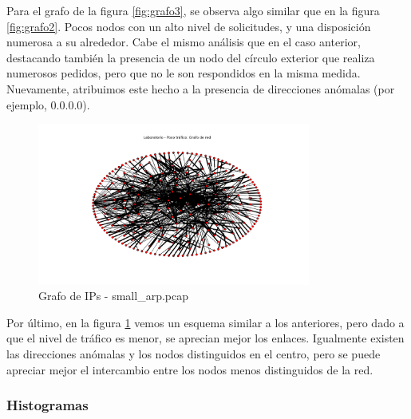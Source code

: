 Para el grafo de la figura \ref{fig:grafo3}, se observa algo similar que en la figura \ref{fig:grafo2}. Pocos nodos con un alto nivel de solicitudes, y una disposición numerosa a su alrededor. Cabe el mismo análisis que en el caso anterior, destacando también la presencia de un nodo del círculo exterior que realiza numerosos pedidos, pero que no le son respondidos en la misma medida. Nuevamente, atribuimos este hecho a la presencia de direcciones anómalas (por ejemplo, $0.0.0.0$).

\begin{figure}[h!]
  \centering
    \includegraphics[width=0.8\textwidth]{graficos/grafoLaboSmall.png}
    \caption{Grafo de IPs - small\_arp.pcap}
    \label{fig:grafo4}
\end{figure}

Por último, en la figura \ref{fig:grafo4} vemos un esquema similar a los anteriores, pero dado a que el nivel de tráfico es menor, se aprecian mejor los enlaces. Igualmente existen las direcciones anómalas y los nodos distinguidos en el centro, pero se puede apreciar mejor el intercambio entre los nodos menos distinguidos de la red.

\subsubsection{Histogramas}

